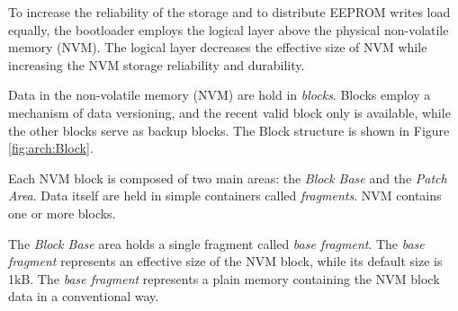 To increase the reliability of the storage and to distribute EEPROM writes load equally, the bootloader employs the logical layer above the physical non-volatile memory (NVM). 
The logical layer decreases the effective size of NVM while increasing the NVM storage reliability and durability. 

Data in the non-volatile memory (NVM) are hold in \textit{blocks}. Blocks employ a mechanism of data versioning, 
and the recent valid block only is available, while the other blocks serve as backup blocks. The Block structure is shown in Figure \ref{fig:arch:Block}. 


Each NVM block is composed of two main areas: the \textit{Block Base} and the \textit{Patch Area}. 
Data itself are held in simple containers called \textit{fragments}. NVM contains one or more blocks.

The \textit{Block Base} area holds a single fragment called \textit{base fragment}. 
The \textit{base fragment} represents an effective size of the NVM block, while its default size is 1kB.
The \textit{base fragment} represents a plain memory containing the NVM block data in a conventional way.

